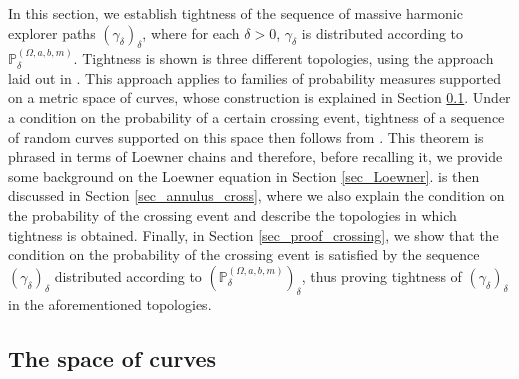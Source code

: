 \documentclass{article}
\newcommand{\PP}{{\mathbb{P}}}
\theoremstyle{definition}
\theoremstyle{remark}
\theoremstyle{remark}
\begin{document}
In this section, we establish tightness of the sequence of massive harmonic explorer paths $(\gamma_{\delta})_{\delta}$, where for each $\delta > 0$, $\gamma_{\delta}$ is distributed according to $\PP_{\delta}^{(\Omega,a,b,m)}$. Tightness is shown is three different topologies, using the approach laid out in \cite{Smirnov}. This approach applies to families of probability measures supported on a metric space of curves, whose construction is explained in Section \ref{sec_curves}. Under a condition on the probability of a certain crossing event, tightness of a sequence of random curves supported on this space then follows from \cite[Theorem~1.7]{Smirnov}. This theorem is phrased in terms of Loewner chains and therefore, before recalling it, we provide some background on the Loewner equation in Section \ref{sec_Loewner}. \cite[Theorem~1.7]{Smirnov} is then discussed in Section \ref{sec_annulus_cross}, where we also explain the condition on the probability of the crossing event and describe the topologies in which tightness is obtained. Finally, in Section \ref{sec_proof_crossing}, we show that the condition on the probability of the crossing event is satisfied by the sequence $(\gamma_{\delta})_{\delta}$ distributed according to $(\PP_{\delta}^{(\Omega,a,b,m)})_{\delta}$, thus proving tightness of $(\gamma_{\delta})_{\delta}$ in the aforementioned topologies.

\subsection{The space of curves} \label{sec_curves}
\end{document}
